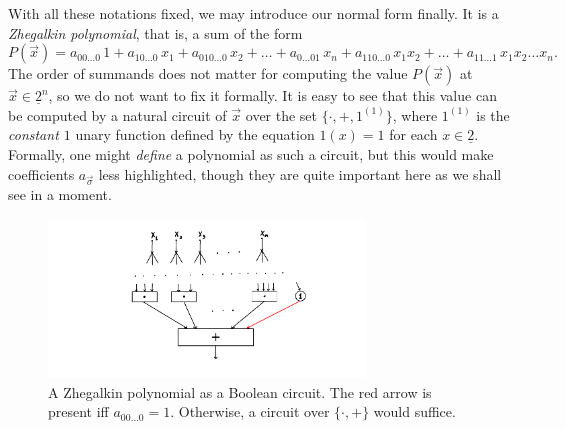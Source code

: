 \documentclass[12pt,notitlepage]{article}
\theoremstyle{plain}
\theoremstyle{definition}
\theoremstyle{plain}
\newcommand{\ul}[1]{\underline{#1}}
\newcommand{\1}{\mathbf{1}}
\newcommand{\0}{\mathbf{0}}
\begin{document}
With all these notations fixed, we may introduce our normal form finally. It is a \emph{Zhegalkin polynomial}, that is, a sum of the form
$$P(\vec x) = a_{00\ldots0}\, 1 + a_{10\ldots0}\, x_1 + a_{010\ldots0}\, x_2 + \ldots + a_{0\ldots01}\, x_n + a_{110\ldots0}\, x_1 x_2 + \ldots + a_{11\ldots 1}\, x_1 x_2\ldots x_n.$$
The order of summands does not matter for computing the value $P(\vec x)$ at $\vec x \in \ul{2}^n$, so we do not want to fix it formally. It is easy to see that this value can be computed by a natural circuit of $\vec x$ over the set $\{ {\cdot}, {+}, 1^{(1)} \}$, where $1^{(1)}$ is the \emph{constant $1$} unary function defined by the equation $1(x) = 1$ for each $x \in \ul{2}$. Formally, one might \emph{define} a polynomial as such a circuit, but this would make coefficients $a_{\vec\sigma}$ less highlighted, though they are quite important here as we shall see in a moment.

\begin{figure}[h]
	\centering
	\includegraphics*[width=0.75\textwidth]{circuits_poly.pdf}
	\caption{A Zhegalkin polynomial as a Boolean circuit. The red arrow is present iff $a_{00\ldots0} = 1$. Otherwise, a circuit over $\{{\cdot}, {+}\}$ would suffice.}
\end{figure}
\end{document}
